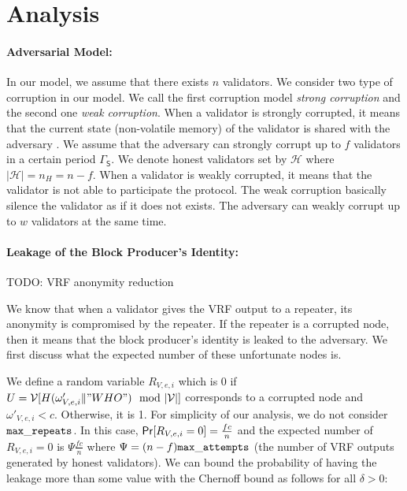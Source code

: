 \newcommand{\nweak}{\ensuremath{w}}
\newcommand{\strongperiod}{\ensuremath{\mathsf{\Gamma_S}}}
\newcommand{\thweak}{\ensuremath{\tau_w}}
\newcommand{\numleak}{\ensuremath{\mathsf{leak}}}
\newcommand{\numanom}{\ensuremath{\mathtt{numanom}}}
\section{Analysis}

\paragraph{Adversarial Model:} In our model, we assume that there exists $ n $ validators.  We consider two type of corruption in our model. We call the first corruption model \emph{strong corruption} and the second one \emph{weak corruption}. When a validator is strongly corrupted, it means that the current state (non-volatile memory) of the validator is shared with the adversary . We assume that the adversary can strongly corrupt up to $ f $ validators in a certain period $\strongperiod$.  We denote honest validators set by $ \mathcal{H} $ where $ |\mathcal{H}| = n_H = n-f $. 
When a validator is weakly corrupted, it means that the validator is not able to participate the protocol. The weak corruption basically silence the validator as if it does not exists. The adversary can weakly corrupt up to $ \nweak $ validators at the same time. 


\paragraph{Leakage of the Block Producer's Identity:}

TODO: VRF anonymity reduction



We know that when a validator gives the VRF output to a repeater, its anonymity is compromised by the repeater. If the repeater is a corrupted node, then it means that the block producer's identity is leaked to the adversary. We first discuss what the expected number of these unfortunate nodes is. 


We define a random variable $ R_{V,e,i} $ which is 0 if $ U = \mathcal{V}[H(\omega'_{V,e,i} \| "WHO") \mod |\mathcal{V}|]  $ corresponds to a corrupted node and $ \omega'_{V,e,i} < c $. Otherwise, it is 1. For simplicity of our analysis, we do not consider $ \mathtt{max\_repeats} $. In this case, $ \mathsf{Pr}[R_{V,e,i} = 0] = \frac{fc}{n} $ and
the expected number of $ R_{V,e,i}  = 0$ is  $ \Psi \frac{fc}{n} $ where $ \Psi = (n-f) \mathtt{max\_attempts} $ (the number of VRF outputs generated by honest validators). We can bound the probability of having the leakage more than some value with the Chernoff bound as follows for all $ \delta > 0 	 $:

